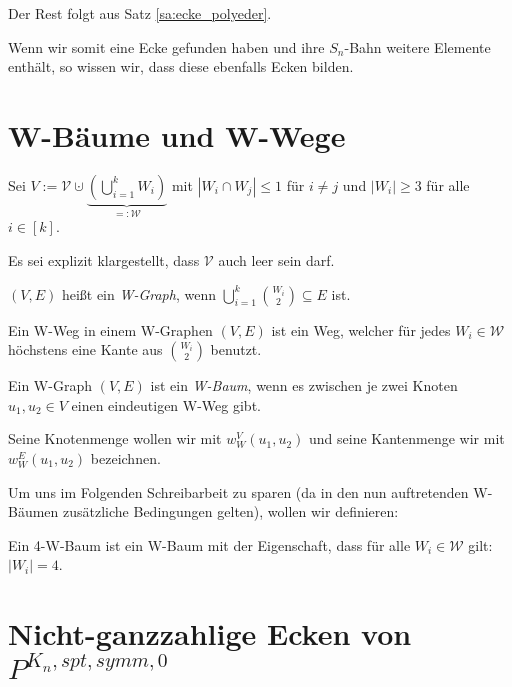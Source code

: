 \documentclass[10p,a4paper,BCOR = 12mm, DIV=15]{scrbook}
\begin{document}
{\begin{bew}
Der Rest folgt aus Satz \ref{sa:ecke_polyeder}.
\end{bew}

Wenn wir somit eine Ecke gefunden haben und ihre $S_n$-Bahn weitere Elemente enthält, so wissen wir, dass diese ebenfalls Ecken bilden.

\section{W-Bäume und W-Wege}

\begin{Def}
Sei $V := \mathcal{V} \cupdot \underbrace{\left(\bigcup_{i=1}^k W_i\right)}_{=: \mathcal{W}} $ mit $\left|W_i \cap W_j\right| \leq 1$ für $i \neq j$ und $\left|W_i\right| \geq 3$ für alle $i\in \left[k\right]$.

Es sei explizit klargestellt, dass $\mathcal{V}$ auch leer sein darf.

$\left(V, E\right)$ heißt ein \emph{W-Graph}, wenn $\bigcup_{i=1}^k {W_i \choose 2} \subseteq E$ ist.
\end{Def}

\begin{Def}
Ein W-Weg in einem W-Graphen $\left(V, E\right)$ ist ein Weg, welcher für jedes $W_i \in \mathcal{W}$ höchstens eine Kante aus $W_i \choose 2$ benutzt.
\end{Def}

\begin{Def}
Ein W-Graph $\left(V, E\right)$ ist ein \emph{W-Baum}, wenn es zwischen je zwei Knoten $u_1, u_2 \in V$ einen eindeutigen W-Weg gibt.

Seine  Knotenmenge wollen wir mit $w_W^V\left(u_1, u_2\right)$ und 
seine Kantenmenge wir mit $w_W^E\left(u_1, u_2\right)$ bezeichnen.
\end{Def}

Um uns im Folgenden Schreibarbeit zu sparen (da in den nun auftretenden W-Bäumen zusätzliche Bedingungen gelten), wollen wir definieren:

\begin{Def}
Ein 4-W-Baum ist ein W-Baum mit der Eigenschaft, dass für alle $W_i \in \mathcal{W}$ gilt: $\left|W_i\right| = 4$.
\end{Def}

\section{Nicht-ganzzahlige Ecken von $P^{K_n, spt, symm, 0}$}

}
\end{document}
